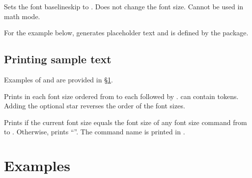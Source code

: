\documentclass{beerydoc}
\begin{document}
\begin{codedoc}{\setfontbaselineskip}
  \begin{syntax}
     
  \end{syntax}
  Sets the font baselineskip to .
  Does not change the font size.
  Cannot be used in math mode.

  For the example below,  generates placeholder text and is defined
  by the  package.
  \begin{codedemo}
    \begingroup
      \the\currentfontbaselineskip\quad\lipsum[1][1-6]

      \setfontbaselineskip{1.2\currentfontbaselineskip}
      \the\currentfontbaselineskip\quad\lipsum[1][1-6]

      \setfontbaselineskip{\currentfontbaselineskip+2pt}
      \the\currentfontbaselineskip\quad\lipsum[1][1-6]

    \endgroup
  \end{codedemo}
\end{codedoc}

\subsection{Printing sample text}
\label{subsec:printsampletext}

Examples of  and  are provided in
\S\ref{sec:examples}.

\begin{codedoc}{\printsampletext}
  \begin{syntax}
     \sarg{} 
  \end{syntax}
  Prints  in each font size ordered from  to  each
  followed by .
   can contain  tokens.
  Adding the optional star reverses the order of the font sizes.
\end{codedoc}

\begin{codedoc}{\printfontsizecommand}
  Prints  if the current font size equals the font
  size of any font size command from  to .
  Otherwise, prints \enquote{\ttfamily\string\undefined}.
  The command name is printed in .
\end{codedoc}


\section{Examples}
\label{sec:examples}
\end{document}
